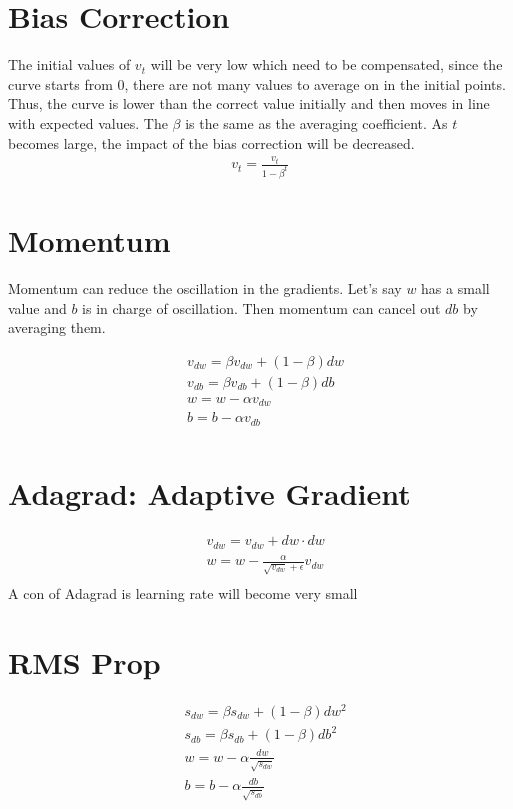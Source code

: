 \section{Bias Correction}
The initial values of $v_t$ will be very low which need to be compensated, since the curve starts from 0, there are not many values to average on in the initial points. Thus, the curve is lower than the correct value initially and then moves in line with expected values. The $\beta$ is the same as the averaging coefficient. As $t$ becomes large, the impact of the bias correction will be decreased. 
\begin{align*}
    v_t = \frac{v_t}{1-\beta^t}
\end{align*}


\section{Momentum}
Momentum can reduce the oscillation in the gradients. Let's say $w$ has a small value and $b$ is in charge of oscillation. Then momentum can cancel out $db$ by averaging them. 

\begin{align*}
    &v_{dw} = \beta v_{dw} + (1-\beta)dw \\
    &v_{db} = \beta v_{db} + (1-\beta)db \\
    & w = w-\alpha v_{dw}\\
    & b = b-\alpha v_{db}\\
\end{align*}

\section{Adagrad: Adaptive Gradient}
\begin{align*}
    &v_{dw} = v_{dw} + dw \cdot dw \\
	& w = w-\frac{\alpha}{\sqrt{v_{dw}}+\epsilon} v_{dw}\\
\end{align*}
A con of Adagrad is learning rate will become very small


\section{RMS Prop}

\begin{align*}
    &s_{dw} = \beta s_{dw} + (1-\beta)dw^2 \\
    &s_{db} = \beta s_{db} + (1-\beta)db^2 \\
	& w = w-\alpha  \frac{dw}{\sqrt{s_{dw}}}\\
	& b = b-\alpha \frac{db}{\sqrt{s_{db}}} \\
\end{align*}

